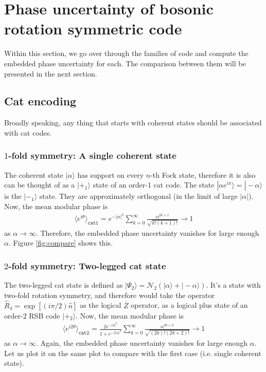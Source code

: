 \documentclass{article}
\begin{document}
\section{Phase uncertainty of bosonic rotation symmetric code}

Within this section, we go over through the families of code and compute the embedded phase uncertainty for each. The comparison between them will be presented in the next section.

\subsection{Cat encoding}

Broadly speaking, any thing that starts with coherent states should be associated with cat codes.

\subsubsection{$1$-fold symmetry: A single coherent state}

The coherent state $|\alpha\rangle$ has support on every $n$-th Fock state, therefore it is also can be thought of as a $|+_1\rangle$ state of an order-1 cat code. The state $|\alpha e^{i\pi}\rangle =|-\alpha\rangle$ is the $|-_1\rangle$ state. They are approximately orthogonal (in the limit of large $|\alpha|$). Now, the mean modular phase is 
\begin{align}
    \langle e^{i\theta}\rangle_{\texttt{cat1}} = e^{-|\alpha|^2}\sum_{k=0}^\infty \frac{\alpha^{2k+1}}{\sqrt{k!(k+1)!}}\to 1
\end{align}
as $\alpha\to\infty$. Therefore, the embedded phase uncertainty vanishes for large enough $\alpha$. Figure \ref{fig:compare} shows this. 

\subsubsection{$2$-fold symmetry: Two-legged cat state}

The two-legged cat state is defined as $|\Psi_2\rangle=\mathcal{N}_2(|\alpha\rangle +|-\alpha\rangle)$. It's a state with two-fold rotation symmetry, and therefore would take the operator $\hat{R}_4=\exp[(i\pi/2)\hat{n}]$ as the logical $\bar{Z}$ operator, as a logical plus state of an order-$2$ RSB code $|+_2\rangle$. Now, the mean modular phase is 
\begin{align}
    \langle e^{i2\theta}\rangle_{\texttt{cat2}} = \frac{2e^{-|\alpha|^2}}{1+e^{-2|\alpha|^2}}\sum_{k=0}^\infty \frac{\alpha^{4k+2}}{\sqrt{(2k)!(2k+2)!}}\to 1
\end{align}
as $\alpha\to\infty$. Again, the embedded phase uncertainty vanishes for large enough $\alpha$. Let us plot it on the same plot to compare with the first case (i.e. single coherent state). 
\end{document}
